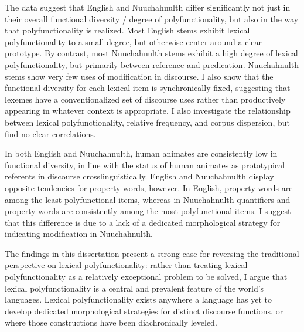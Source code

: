 The data suggest that English and Nuuchahnulth differ significantly not just in their overall functional diversity / degree of polyfunctionality, but also in the way that polyfunctionality is realized. Most English stems exhibit lexical polyfunctionality to a small degree, but otherwise center around a clear prototype. By contrast, most Nuuchahnulth stems exhibit a high degree of lexical polyfunctionality, but primarily between reference and predication. Nuuchahnulth stems show very few uses of modification in discourse. I also show that the functional diversity for each lexical item is synchronically fixed, suggesting that lexemes have a conventionalized set of discourse uses rather than productively appearing in whatever context is appropriate. I also investigate the relationship between lexical polyfunctionality, relative frequency, and corpus dispersion, but find no clear correlations.

In both English and Nuuchahnulth, human animates are consistently low in functional diversity, in line with the status of human animates as prototypical referents in discourse crosslinguistically. English and Nuuchahnulth display opposite tendencies for property words, however. In English, property words are among the least polyfunctional items, whereas in Nuuchahnulth quantifiers and property words are consistently among the most polyfunctional items. I suggest that this difference is due to a lack of a dedicated morphological strategy for indicating modification in Nuuchahnulth.

The findings in this dissertation present a strong case for reversing the traditional perspective on lexical polyfunctionality: rather than treating lexical polyfunctionality as a relatively exceptional problem to be solved, I argue that lexical polyfunctionality is a central and prevalent feature of the world's languages. Lexical polyfunctionality exists anywhere a language has yet to develop dedicated morphological strategies for distinct discourse functions, or where those constructions have been diachronically leveled.
